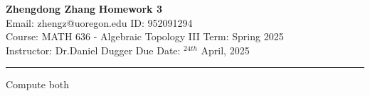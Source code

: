 \documentclass[a4paper, 12pt]{article}
\begin{document}
\noindent
\large\textbf{Zhengdong Zhang} \hfill \textbf{Homework 3}   \\
Email: zhengz@uoregon.edu \hfill ID: 952091294 \\
\normalsize Course: MATH 636 - Algebraic Topology III \hfill Term: Spring 2025\\
Instructor: Dr.Daniel Dugger \hfill Due Date: $^{24th}$ April, 2025 \\
\noindent\rule{7in}{2.8pt}

\begin{problem}{1}
Compute both 
\end{problem}





\end{document}
